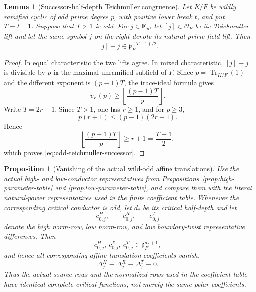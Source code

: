 \documentclass[11pt]{amsart}
\newtheorem{proposition}[theorem]{Proposition}
\newtheorem{lemma}[theorem]{Lemma}
\theoremstyle{definition}
\theoremstyle{remark}
\newcommand{\F}{\mathbf F}
\newcommand{\cO}{\mathcal O}
\newcommand{\p}{\mathfrak p}
\newcommand{\Tr}{\operatorname{Tr}}
\begin{document}
\begin{lemma}[Successor-half-depth Teichmuller congruence]
\label{lem:odd-teichmuller-successor}
Let $K/F$ be wildly ramified cyclic of odd prime degree $p$, with
positive lower break $t$, and put $T=t+1$.  Suppose that $T>1$ is odd.
For $j\in\F_p$, let $[j]\in\cO_F$ be its Teichmuller lift and let the
same symbol $j$ on the right denote its natural prime-field lift.  Then
\begin{equation}\label{eq:odd-teichmuller-successor}
 [j]-j\in\p_F^{(T+1)/2}.
\end{equation}
\end{lemma}

\begin{proof}
In equal characteristic the two lifts agree.  In mixed characteristic,
$[j]-j$ is divisible by $p$ in the maximal unramified subfield of $F$.
Since $p=\Tr_{K/F}(1)$ and the different exponent is $(p-1)T$, the
trace-ideal formula gives
\[
 v_F(p)\ge \left\lfloor\frac{(p-1)T}{p}\right\rfloor.
\]
Write $T=2r+1$.  Since $T>1$, one has $r\ge1$, and for $p\ge3$,
\[
 p(r+1)\le(p-1)(2r+1).
\]
Hence
\[
 \left\lfloor\frac{(p-1)T}{p}\right\rfloor
 \ge r+1=\frac{T+1}{2},
\]
which proves \eqref{eq:odd-teichmuller-successor}.
\end{proof}

\begin{proposition}[Vanishing of the actual wild-odd affine translations]
\label{prop:wild-odd-translation-vanishing}
Use the actual high- and low-conductor representatives from
Propositions~\ref{prop:high-parameter-table} and
\ref{prop:low-parameter-table}, and compare them with the literal
natural-power representatives used in the finite coefficient table.
Whenever the corresponding critical conductor is odd, let $d_*$ be its
critical half-depth and let
\[
 c_{0,j}^{H},\qquad c_{0,j}^{R},\qquad c_{0,j}^{T}
\]
denote the high norm-row, low norm-row, and low boundary-twist
representative differences.  Then
\begin{equation}\label{eq:wild-odd-translation-differences-deep}
 c_{0,j}^{H},\ c_{0,j}^{R},\ c_{0,j}^{T}
 \in\p_F^{d_*+1},
\end{equation}
and hence all corresponding affine translation coefficients vanish:
\begin{equation}\label{eq:wild-odd-translation-coefficients-zero}
 \Delta_j^H=\Delta_j^R=\Delta_j^T=0.
\end{equation}
Thus the actual source rows and the normalized rows used in the
coefficient table have identical complete critical functions, not merely
the same polar coefficients.
\end{proposition}
\end{document}
